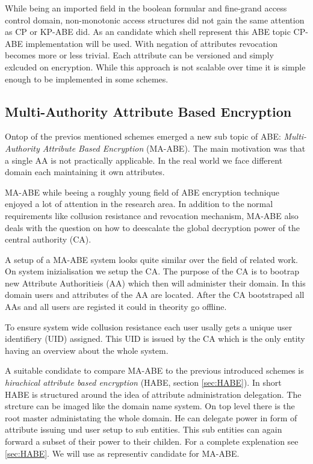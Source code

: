 While being an imported field in the boolean formular and fine-grand access control domain, non-monotonic access structures did not gain the same attention as CP or KP-ABE did. As an candidate which shell represent this ABE topic \cite{10.1007/978-3-642-54631-0_16} CP-ABE implementation will be used. With negation of attributes revocation becomes more or less trivial. Each attribute can be versioned and simply exlcuded on encryption. While this approach is not scalable over time it is simple enough to be implemented in some schemes.   

\subsection{Multi-Authority Attribute Based Encryption}
Ontop of the previos mentioned schemes emerged a new sub topic of ABE: \textit{Multi-Authority Attribute Based Encryption} (MA-ABE). The main motivation was that a single AA is not practically applicable. In the real world we face different domain each maintaining it own attributes. 

MA-ABE while beeing a roughly young field of ABE encryption technique enjoyed a lot of attention in the research area. In addition to the normal requirements like collusion resistance and revocation mechanism, MA-ABE also deals with the question on how to deescalate the global decryption power of the central authority (CA). 

A setup of a MA-ABE system looks quite similar over the field of related work. On system inizialisation we setup the CA. The purpose of the CA is to bootrap new Attribute Authoritieis (AA) which then will administer their domain. In this domain users and attributes of the AA are located. After the CA bootstraped all AAs and all users are registed it could in theority go offline. 

To ensure system wide collusion resistance each user usally gets a unique user identifiery (UID) assigned. This UID is issued by the CA which is the only entity having an overview about the whole system. 

A suitable condidate to compare MA-ABE to the previous introduced schemes is \textit{hirachical attribute based encryption} (HABE, section \ref{sec:HABE}). In short HABE is structured around the idea of attribute administration delegation. The strcture can be imaged like the domain name system. On top level there is the root master administating the whole domain. He can delegate power in form of attribute issuing und user setup to sub entities. This sub entities can again forward a subset of their power to their childen. For a complete explenation see \ref{sec:HABE}. We will use \cite{Wang:2010:HAE:1866307.1866414} as representiv candidate for MA-ABE. 

